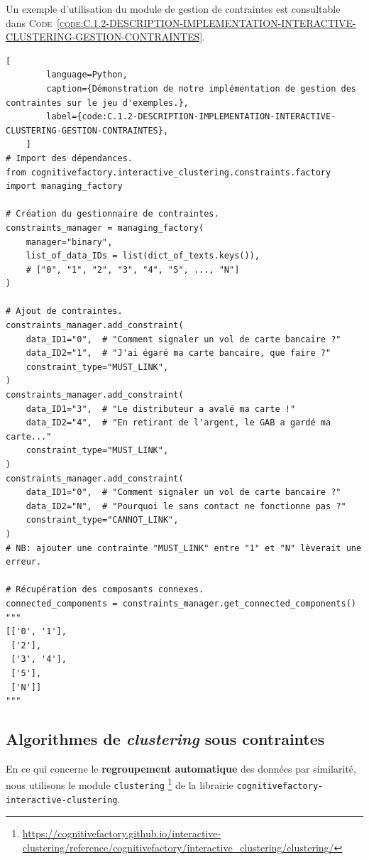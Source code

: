 	Un exemple d'utilisation du module de gestion de contraintes est consultable dans \textsc{Code~\ref{code:C.1.2-DESCRIPTION-IMPLEMENTATION-INTERACTIVE-CLUSTERING-GESTION-CONTRAINTES}}.
	
	\begin{lstlisting}[
		language=Python,
		caption={Démonstration de notre implémentation de gestion des contraintes sur le jeu d'exemples.},
		label={code:C.1.2-DESCRIPTION-IMPLEMENTATION-INTERACTIVE-CLUSTERING-GESTION-CONTRAINTES},
	]
# Import des dépendances.
from cognitivefactory.interactive_clustering.constraints.factory import managing_factory

# Création du gestionnaire de contraintes.
constraints_manager = managing_factory(
	manager="binary",
	list_of_data_IDs = list(dict_of_texts.keys()),
	# ["0", "1", "2", "3", "4", "5", ..., "N"]
)

# Ajout de contraintes.
constraints_manager.add_constraint(
	data_ID1="0",  # "Comment signaler un vol de carte bancaire ?"
	data_ID2="1",  # "J'ai égaré ma carte bancaire, que faire ?"
	constraint_type="MUST_LINK",
)
constraints_manager.add_constraint(
	data_ID1="3",  # "Le distributeur a avalé ma carte !"
	data_ID2="4",  # "En retirant de l'argent, le GAB a gardé ma carte..."
	constraint_type="MUST_LINK",
)
constraints_manager.add_constraint(
	data_ID1="0",  # "Comment signaler un vol de carte bancaire ?"
	data_ID2="N",  # "Pourquoi le sans contact ne fonctionne pas ?"
	constraint_type="CANNOT_LINK",
)
# NB: ajouter une contrainte "MUST_LINK" entre "1" et "N" lèverait une erreur.

# Récupération des composants connexes.
connected_components = constraints_manager.get_connected_components()
"""
[['0', '1'],
 ['2'],
 ['3', '4'],
 ['5'],
 ['N']]
"""
	\end{lstlisting}
	
	
	\subsection{Algorithmes de \textit{clustering} sous contraintes}
	\label{annex:C.1.3-DESCRIPTION-IMPLEMENTATION-INTERACTIVE-CLUSTERING-ALGORITHMES-CLUSTERING-SOUS-CONTRAINTES}
	
	En ce qui concerne le \textbf{regroupement automatique} des données par similarité, nous utilisons le module \texttt{clustering} \footnote{
		\url{https://cognitivefactory.github.io/interactive-clustering/reference/cognitivefactory/interactive_clustering/clustering/}
	} de la librairie \texttt{cognitivefactory-interactive-clustering}.
	
